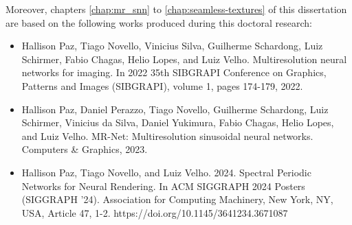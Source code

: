Moreover, chapters \ref{chap:mr_snn} to \ref{chap:seamless-textures} of this dissertation are based on the following works produced during this doctoral research:

\begin{itemize}
    \item Hallison Paz, Tiago Novello, Vinicius Silva, Guilherme Schardong, Luiz Schirmer, Fabio Chagas, Helio Lopes, and Luiz Velho. Multiresolution neural networks for imaging. In 2022 35th SIBGRAPI Conference on Graphics, Patterns and Images (SIBGRAPI), volume 1, pages 174-179, 2022.
    \item Hallison Paz, Daniel Perazzo, Tiago Novello, Guilherme Schardong, Luiz Schirmer, Vinicius da Silva, Daniel Yukimura, Fabio Chagas, Helio Lopes, and Luiz Velho. MR-Net: Multiresolution sinusoidal neural networks. Computers \& Graphics, 2023.
    \item Hallison Paz, Tiago Novello, and Luiz Velho. 2024. Spectral Periodic Networks for Neural Rendering. In ACM SIGGRAPH 2024 Posters (SIGGRAPH '24). Association for Computing Machinery, New York, NY, USA, Article 47, 1-2. https://doi.org/10.1145/3641234.3671087
\end{itemize}






